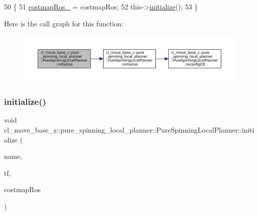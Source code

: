 \begin{DoxyCode}
50 \{
51   \hyperlink{classcl__move__base__z_1_1pure__spinning__local__planner_1_1PureSpinningLocalPlanner_a63f75481071df118d56e8b652e68b002}{costmapRos\_} = costmapRos;
52   this->\hyperlink{classcl__move__base__z_1_1pure__spinning__local__planner_1_1PureSpinningLocalPlanner_a12fc5253f53f66e3e9735a72ebc9343f}{initialize}();
53 \}
\end{DoxyCode}
Here is the call graph for this function\+:
\nopagebreak
\begin{figure}[H]
\begin{center}
\leavevmode
\includegraphics[width=350pt]{classcl__move__base__z_1_1pure__spinning__local__planner_1_1PureSpinningLocalPlanner_afc2d05b55e4a68932bbf8b4aabe9e219_cgraph}
\end{center}
\end{figure}
\mbox{\label{classcl__move__base__z_1_1pure__spinning__local__planner_1_1PureSpinningLocalPlanner_ab28ef2ff04e7ec2b74068ea0fe3351d6}} 
\subsubsection{\texorpdfstring{initialize()}{initialize()}\hspace{0.1cm}{\footnotesize\ttfamily [2/3]}}
{\footnotesize\ttfamily void cl\+\_\+move\+\_\+base\+\_\+z\+::pure\+\_\+spinning\+\_\+local\+\_\+planner\+::\+Pure\+Spinning\+Local\+Planner\+::initialize (\begin{DoxyParamCaption}\item[{std\+::string}]{name,  }\item[{tf2\+\_\+ros\+::\+Buffer $\ast$}]{tf,  }\item[{costmap\+\_\+2d\+::\+Costmap2\+D\+R\+OS $\ast$}]{costmap\+Ros }\end{DoxyParamCaption})}



